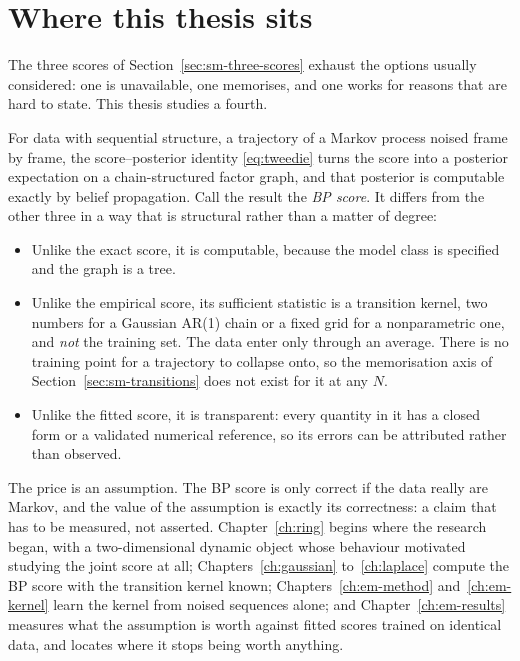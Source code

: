 \section{Where this thesis sits}
\label{sec:sm-position}\label{sec:related}\label{sec:gap}

The three scores of Section~\ref{sec:sm-three-scores} exhaust the options
usually considered: one is unavailable, one memorises, and one works for
reasons that are hard to state. This thesis studies a fourth.

For data with sequential structure, a trajectory of a Markov process noised
frame by frame, the score--posterior identity \eqref{eq:tweedie} turns the
score into a posterior expectation on a chain-structured factor graph, and that
posterior is computable exactly by belief propagation. Call the result the
\emph{BP score}. It differs from the other three in a way that is structural
rather than a matter of degree:

\begin{itemize}
  \item Unlike the exact score, it is computable, because the model class is
  specified and the graph is a tree.
  \item Unlike the empirical score, its sufficient statistic is a transition
  kernel, two numbers for a Gaussian AR(1) chain or a fixed grid for a
  nonparametric one, and \emph{not} the training set. The data enter only
  through an average. There is no training point for a trajectory to collapse
  onto, so the memorisation axis of Section~\ref{sec:sm-transitions} does not
  exist for it at any $N$.
  \item Unlike the fitted score, it is transparent: every quantity in it has a
  closed form or a validated numerical reference, so its errors can be
  attributed rather than observed.
\end{itemize}

\noindent The price is an assumption. The BP score is only correct if the data
really are Markov, and the value of the assumption is exactly its correctness:
a claim that has to be measured, not asserted. Chapter~\ref{ch:ring} begins
where the research began, with a two-dimensional dynamic object whose behaviour
motivated studying the joint score at all; Chapters~\ref{ch:gaussian}
to~\ref{ch:laplace} compute the BP score with the transition kernel known;
Chapters~\ref{ch:em-method} and~\ref{ch:em-kernel} learn the kernel from noised
sequences alone; and Chapter~\ref{ch:em-results} measures what the assumption
is worth against fitted scores trained on identical data, and locates where it
stops being worth anything.
